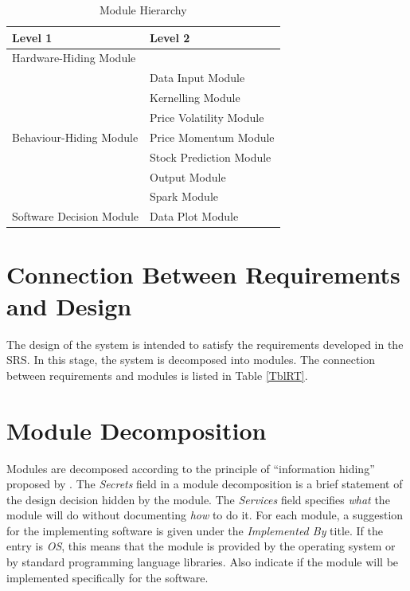 \documentclass[12pt, titlepage]{article}
\begin{document}
\begin{table}[h!]
\centering
\begin{tabular}{p{} p{}}
\toprule
\textbf{Level 1} & \textbf{Level 2}\\
\midrule

{Hardware-Hiding Module} & ~ \\
\midrule

\multirow{7}{0.3\textwidth}{Behaviour-Hiding Module}& Data Input Module\\
& Kernelling Module\\ 
& Price Volatility Module\\
& Price Momentum Module\\
& Stock Prediction Module\\
& Output Module\\
& Spark Module\\
\midrule

\multirow{1}{0.3\textwidth}{Software Decision Module} & Data Plot Module\\


\bottomrule

\end{tabular}
\caption{Module Hierarchy}
\label{TblMH}
\end{table}

\section{Connection Between Requirements and Design} \label{SecConnection}

The design of the system is intended to satisfy the requirements developed in
the SRS. In this stage, the system is decomposed into modules. The connection
between requirements and modules is listed in Table \ref{TblRT}.

\section{Module Decomposition} \label{SecMD}

Modules are decomposed according to the principle of ``information hiding''
proposed by \citet{ParnasEtAl1984}. The \emph{Secrets} field in a module
decomposition is a brief statement of the design decision hidden by the
module. The \emph{Services} field specifies \emph{what} the module will do
without documenting \emph{how} to do it. For each module, a suggestion for the
implementing software is given under the \emph{Implemented By} title. If the
entry is \emph{OS}, this means that the module is provided by the operating
system or by standard programming language libraries. Also indicate if the
module will be implemented specifically for the software.
\end{document}
